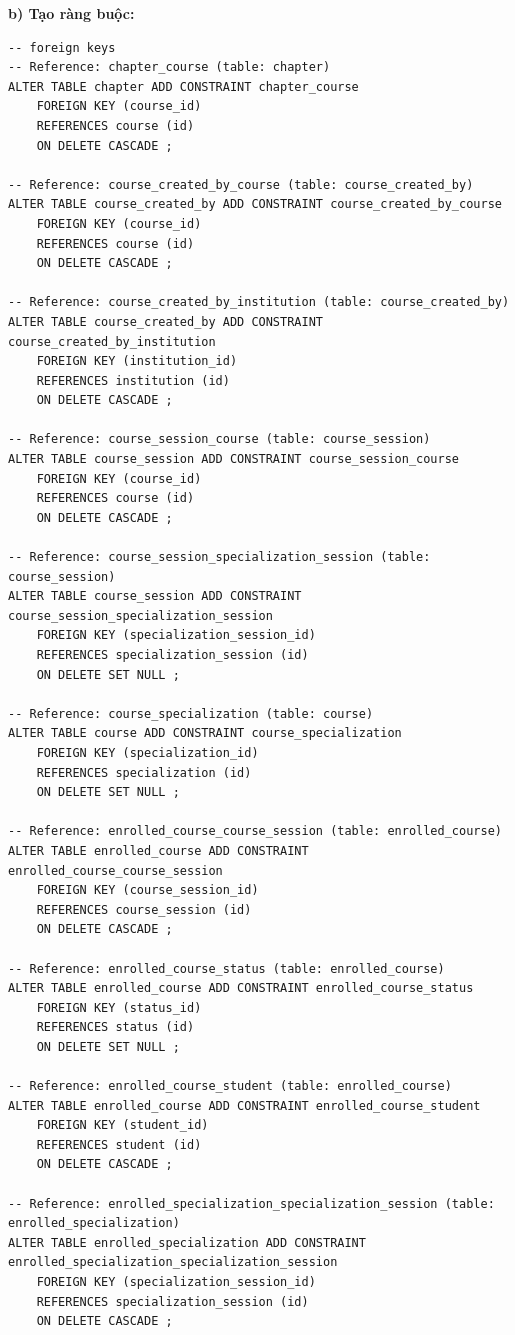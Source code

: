 \documentclass[12pt,a4paper,titlepage]{article}
\begin{document}
\textbf{b) Tạo ràng buộc:}
\begin{lstlisting}
-- foreign keys
-- Reference: chapter_course (table: chapter)
ALTER TABLE chapter ADD CONSTRAINT chapter_course
    FOREIGN KEY (course_id)
    REFERENCES course (id)
    ON DELETE CASCADE ;

-- Reference: course_created_by_course (table: course_created_by)
ALTER TABLE course_created_by ADD CONSTRAINT course_created_by_course
    FOREIGN KEY (course_id)
    REFERENCES course (id)
    ON DELETE CASCADE ;

-- Reference: course_created_by_institution (table: course_created_by)
ALTER TABLE course_created_by ADD CONSTRAINT course_created_by_institution
    FOREIGN KEY (institution_id)
    REFERENCES institution (id)
    ON DELETE CASCADE ;

-- Reference: course_session_course (table: course_session)
ALTER TABLE course_session ADD CONSTRAINT course_session_course
    FOREIGN KEY (course_id)
    REFERENCES course (id)
    ON DELETE CASCADE ;

-- Reference: course_session_specialization_session (table: course_session)
ALTER TABLE course_session ADD CONSTRAINT course_session_specialization_session
    FOREIGN KEY (specialization_session_id)
    REFERENCES specialization_session (id)
    ON DELETE SET NULL ;

-- Reference: course_specialization (table: course)
ALTER TABLE course ADD CONSTRAINT course_specialization
    FOREIGN KEY (specialization_id)
    REFERENCES specialization (id)
    ON DELETE SET NULL ;

-- Reference: enrolled_course_course_session (table: enrolled_course)
ALTER TABLE enrolled_course ADD CONSTRAINT enrolled_course_course_session
    FOREIGN KEY (course_session_id)
    REFERENCES course_session (id) 
    ON DELETE CASCADE ;

-- Reference: enrolled_course_status (table: enrolled_course)
ALTER TABLE enrolled_course ADD CONSTRAINT enrolled_course_status
    FOREIGN KEY (status_id)
    REFERENCES status (id)
    ON DELETE SET NULL ;

-- Reference: enrolled_course_student (table: enrolled_course)
ALTER TABLE enrolled_course ADD CONSTRAINT enrolled_course_student
    FOREIGN KEY (student_id)
    REFERENCES student (id)
    ON DELETE CASCADE ;

-- Reference: enrolled_specialization_specialization_session (table: enrolled_specialization)
ALTER TABLE enrolled_specialization ADD CONSTRAINT enrolled_specialization_specialization_session
    FOREIGN KEY (specialization_session_id)
    REFERENCES specialization_session (id)  
    ON DELETE CASCADE ;


\end{lstlisting}
\end{document}

